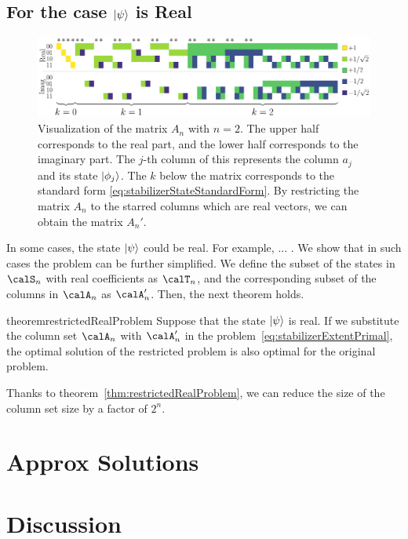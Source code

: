 \documentclass[a4paper, onecolumn, 11pt, longbibliography]{quantumarticle}
\begin{document}
\subsection{For the case $\ket{\psi}$ is Real}
\label{sec:restrictedRealProblem}

\begin{figure}[htbp]
  \centering
  \includegraphics[width=\columnwidth]{imgs/Amat.pdf}
  \caption{
    Visualization of the matrix $A_n$ with $n=2$.
    The upper half corresponds to the real part,
    and the lower half corresponds to the imaginary part.
    The $j$-th column of this represents
    the column $a_j$ and its state $\ket{\phi_j}$.
    The $k$ below the matrix
    corresponds to
    the standard form \eqref{eq:stabilizerStateStandardForm}.
    By restricting the matrix $A_n$
    to the starred columns
    which are real vectors,
    we can obtain the matrix $A_n'$.
  }
  \label{fig:Amat}
\end{figure}

In some cases, the state $\ket{\psi}$ could be real.
For example, ... .
We show that in such cases the problem can be further simplified.
We define the subset of the states in $\calS_n$ with real coefficients as $\calT_n$,
and the corresponding subset of the columns in $\calA_n$ as $\calA'_n$.
Then, the next theorem holds.
\begin{restatable}{theorem}{restrictedRealProblem}
  \label{thm:restrictedRealProblem}
  Suppose that the state $\ket{\psi}$ is real.
  If we substitute the column set $\calA_n$ with $\calA'_n$
  in the problem~\eqref{eq:stabilizerExtentPrimal},
  the optimal solution of the restricted problem
  is also optimal for the original problem.
\end{restatable}

Thanks to theorem~\ref{thm:restrictedRealProblem},
we can reduce the size of the column set size
by a factor of $2^n$.

\section{Approx Solutions}

\section{Discussion}
\end{document}
